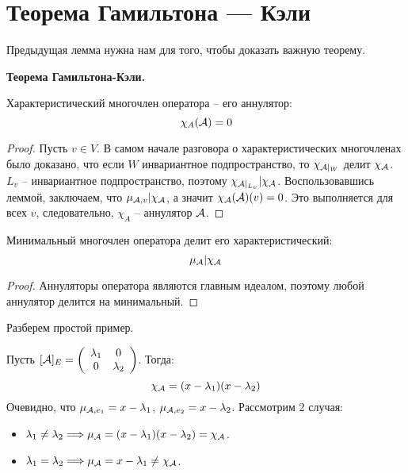 \section{Теорема Гамильтона — Кэли}
Предыдущая лемма нужна нам для того, чтобы доказать важную теорему.

\textbf{Теорема Гамильтона-Кэли.} 

\quad\quad Характеристический многочлен оператора -- его аннулятор: \[ \chi_A(\mathcal{A}) = 0 \]

\begin{proof}
    Пусть $v \in V$.
    В самом начале разговора о характеристических многочленах было доказано, что если $W$ инвариантное подпространство, то $\chi_{\mathcal{A}|_W}$ делит $\chi_{\mathcal{A}}$.
    $L_v$ -- инвариантное подпространство, поэтому $\chi_{\mathcal{A}|_{L_v}} | \chi_{\mathcal{A}}$. 
    Воспользовавшись леммой, заключаем, что $\mu_{\mathcal{A}, v} | \chi_{\mathcal{A}}$, а значит $\chi_{\mathcal{A}}(\mathcal{A})(v) = 0$.
    Это выполняется для всех $v$, следовательно, $\chi_A$ -- аннулятор $\mathcal{A}$.
\end{proof}

\vspace*{3mm}

\follow Минимальный многочлен оператора делит его характеристический: \[ \mu_{\mathcal{A}} | \chi_{\mathcal{A}} \]
\begin{proof}
    Аннуляторы оператора являются главным идеалом, поэтому любой аннулятор делится на минимальный.
\end{proof}

\vspace*{3mm}

Разберем простой пример.

\begin{example}
    Пусть $[\mathcal{A}]_E = \left(\begin{array}{cc}
        \lambda_1 & 0 \\ 
        0 & \lambda_2
        \end{array}\right)$.
        Тогда: \[ \chi_{\mathcal{A}} = (x - \lambda_1)(x - \lambda_2) \]
        Очевидно, что $\mu_{\mathcal{A}, e_1} = x - \lambda_1$, $\mu_{\mathcal{A}, e_2} = x - \lambda_2$.
        Рассмотрим 2 случая:
        \begin{itemize}
            \item $ \lambda_1 \neq \lambda_2 \Longrightarrow \mu_{\mathcal{A}} = (x - \lambda_1) (x - \lambda_2) = \chi_{\mathcal{A}}$.
            \item $ \lambda_1 = \lambda_2 \Longrightarrow \mu_{\mathcal{A}} = x - \lambda_1 \neq \chi_{\mathcal{A}}$.
        \end{itemize} 
\end{example}
